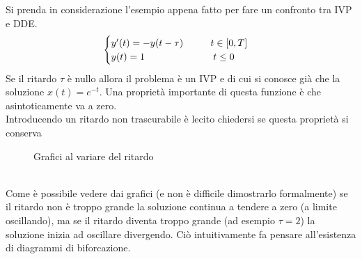 \begin{oss}
 Si prenda in considerazione l'esempio appena fatto per fare un confronto tra IVP e DDE.
 $$
\begin{cases}
 y'(t)=-y(t-\tau)		 	\hspace{1cm}		t \in [0,T]	\\
 y(t)=1					\hspace{2.5cm}		t \le 0
\end{cases}
$$
Se il ritardo $\tau$ è nullo allora il problema è un IVP e di cui si conosce già che la soluzione $x(t)=e^{-t}$.
Una proprietà importante di questa funzione è che asintoticamente va a zero. \\
Introducendo un ritardo non trascurabile è lecito chiedersi se questa proprietà si conserva
\begin{figure}[h]
\centering
\caption{Grafici al variare del ritardo}
\hspace{1mm}
\hspace{1mm}
\end{figure}\\
Come è possibile vedere dai grafici (e non è difficile dimostrarlo formalmente) se il ritardo 
non è troppo grande la soluzione continua a tendere a zero (a limite oscillando), ma se 
il ritardo diventa troppo grande (ad esempio $\tau=2$) la soluzione inizia ad oscillare divergendo.
Ciò intuitivamente fa pensare all'esistenza di diagrammi di biforcazione.
\end{oss}

